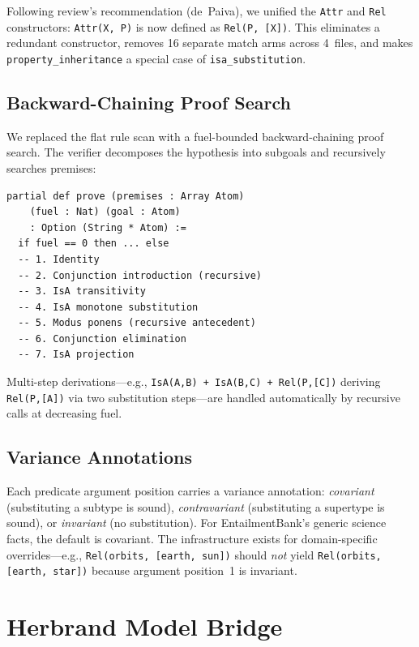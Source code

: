 \documentclass[]{article}
\newcommand{\code}[1]{\texttt{#1}}
\begin{document}
Following review's recommendation (de~Paiva), we unified the
\code{Attr} and \code{Rel} constructors: \code{Attr(X, P)} is now
defined as \code{Rel(P, [X])}.  This eliminates a redundant constructor,
removes 16 separate match arms across 4~files, and makes
\code{property\_inheritance} a special case of \code{isa\_substitution}.

\subsection{Backward-Chaining Proof Search}

We replaced the flat rule scan with a fuel-bounded backward-chaining
proof search.  The verifier decomposes the hypothesis into subgoals and
recursively searches premises:

\begin{lstlisting}
partial def prove (premises : Array Atom)
    (fuel : Nat) (goal : Atom)
    : Option (String * Atom) :=
  if fuel == 0 then ... else
  -- 1. Identity
  -- 2. Conjunction introduction (recursive)
  -- 3. IsA transitivity
  -- 4. IsA monotone substitution
  -- 5. Modus ponens (recursive antecedent)
  -- 6. Conjunction elimination
  -- 7. IsA projection
\end{lstlisting}

Multi-step derivations---e.g., \code{IsA(A,B) + IsA(B,C) + Rel(P,[C])}
deriving \code{Rel(P,[A])} via two substitution steps---are handled
automatically by recursive calls at decreasing fuel.

\subsection{Variance Annotations}

Each predicate argument position carries a variance annotation:
\emph{covariant} (substituting a subtype is sound),
\emph{contravariant} (substituting a supertype is sound), or
\emph{invariant} (no substitution).  For EntailmentBank's generic
science facts, the default is covariant.  The infrastructure exists
for domain-specific overrides---e.g., \code{Rel(orbits, [earth, sun])}
should \emph{not} yield \code{Rel(orbits, [earth, star])} because
argument position~1 is invariant.

\section{Herbrand Model Bridge}
\label{sec:herbrand}
\end{document}

